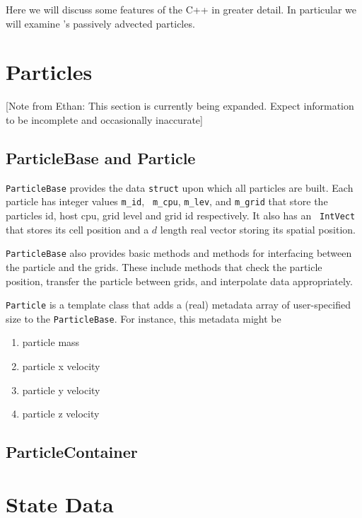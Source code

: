 Here we will discuss some features of the C++ in greater detail. In 
particular we will examine \BoxLib's passively advected particles.

\section{Particles}\label{Sec:Particles}
[Note from Ethan: This section is currently being expanded. Expect information to be 
incomplete and occasionally inaccurate]

\subsection{ParticleBase and Particle}
{\tt ParticleBase} provides the data {\tt struct} upon which all 
particles are built. Each particle has integer values {\tt m\_id}, {\tt 
m\_cpu}, {\tt m\_lev}, and {\tt m\_grid} that store the particles id, 
host cpu, grid level and grid id respectively. It also has an {\tt 
IntVect} that stores its cell position and a $d$ length real vector 
storing its spatial position.

{\tt ParticleBase} also provides basic methods and methods for interfacing between 
the particle and the grids. These include methods that check the 
particle position, transfer the particle between grids, and 
interpolate data appropriately.

{\tt Particle} is a template class that adds a (real) metadata array of 
user-specified size to the {\tt ParticleBase}. For instance, this 
metadata might be 
\begin{enumerate}
   \item particle mass
   \item particle x velocity
   \item particle y velocity
   \item particle z velocity
\end{enumerate}
\subsection{ParticleContainer}

\section{State Data}

